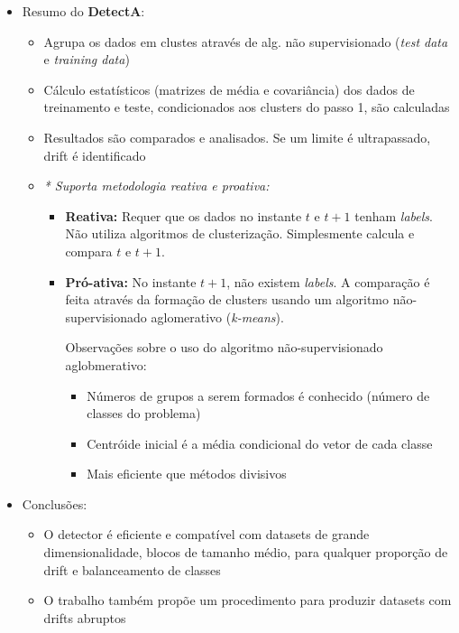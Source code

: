 \documentclass[qual, classic, a4paper]{ufbathesis}
\begin{document}
\begin{itemize}
    \item Resumo do \textbf{DetectA}:
    \begin{itemize}
        \item Agrupa os dados em clustes através de alg. não supervisionado (\textit{test data} e \textit{training data})
        \item Cálculo estatísticos (matrizes de média e covariância) dos dados de treinamento e teste, condicionados aos clusters do passo 1, são calculadas
        \item Resultados são comparados e analisados. Se um limite é ultrapassado, drift é identificado
        \item \textit{* Suporta metodologia reativa e proativa:}
        \begin{itemize}
            \item \textbf{Reativa:} Requer que os dados no instante $t$ e $t + 1$ tenham \textit{labels}. 
            Não utiliza algoritmos de clusterização. Simplesmente calcula e compara $t$ e $t + 1$.
            \item \textbf{Pró-ativa:} No instante $t + 1$, não existem \textit{labels}. A comparação é feita através da formação de clusters usando um algoritmo não-supervisionado aglomerativo (\textit{k-means}).

            Observações sobre o uso do algoritmo não-supervisionado aglobmerativo:
            \begin{itemize}
                \item Números de grupos a serem formados é conhecido (número de classes do problema)
                \item Centróide inicial é a média condicional do vetor de cada classe
                \item Mais eficiente que métodos divisivos
            \end{itemize}
        \end{itemize}
    \end{itemize}

    \item Conclusões:
    \begin{itemize}
        \item O detector é eficiente e compatível com datasets de grande dimensionalidade, blocos de tamanho médio, para qualquer proporção de drift e balanceamento de classes
        \item O trabalho também propõe um procedimento para produzir datasets com drifts abruptos
    \end{itemize}


\end{itemize}
\end{document}
